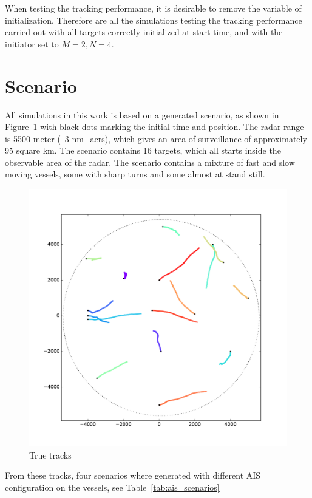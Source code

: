 When testing the tracking performance, it is desirable to remove the variable of initialization. Therefore are all the simulations testing the tracking performance carried out with all targets correctly initialized at start time, and with the initiator set to \(M=2, N=4\).


\section{Scenario}\label{sec:scenario}
All simulations in this work is based on a generated scenario, as shown in Figure~\ref{fig:test_scenario} with black dots marking the initial time and position. The radar range is 5500 meter (~3 \glspl{nm_acr}), which gives an area of surveillance of approximately 95 square km. The scenario contains 16 targets, which all starts inside the observable area of the radar. The scenario contains a mixture of fast and slow moving vessels, some with sharp turns and some almost at stand still. 
\begin{figure}[H]
\centering
\includegraphics[width = .8\textwidth]{Figures/scenarioTruth.pdf}
\caption{True tracks}\label{fig:test_scenario}
\end{figure}
From these tracks, four scenarios where generated with different AIS configuration on the vessels, see Table~\ref{tab:ais_scenarios}
